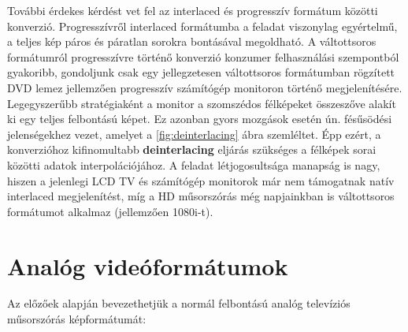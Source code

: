 További érdekes kérdést vet fel az interlaced és progresszív formátum közötti konverzió.
Progresszívről interlaced formátumba a feladat viszonylag egyértelmű, a teljes kép páros és páratlan sorokra bontásával megoldható.
A váltottsoros formátumról progresszívre történő konverzió konzumer felhasználási szempontból gyakoribb, gondoljunk csak egy jellegzetesen váltottsoros formátumban rögzített DVD lemez jellemzően progresszív számítógép monitoron történő megjelenítésére.
Legegyszerűbb stratégiaként a monitor a szomszédos félképeket összeszőve alakít ki egy teljes felbontású képet.
Ez azonban gyors mozgások esetén ún. fésűsödési jelenségekhez vezet, amelyet a \ref{fig:deinterlacing} ábra szemléltet.
Épp ezért, a konverzióhoz kifinomultabb \textbf{deinterlacing} eljárás szükséges a félképek sorai közötti adatok interpolációjához.
A feladat létjogosultsága manapság is nagy, hiszen a jelenlegi LCD TV és számítógép monitorok már nem támogatnak natív interlaced megjelenítést, míg a HD műsorszórás még napjainkban is váltottsoros formátumot alkalmaz (jellemzően 1080i-t).


\section{Analóg videóformátumok}

Az előzőek alapján bevezethetjük a normál felbontású analóg televíziós műsorszórás képformátumát:

